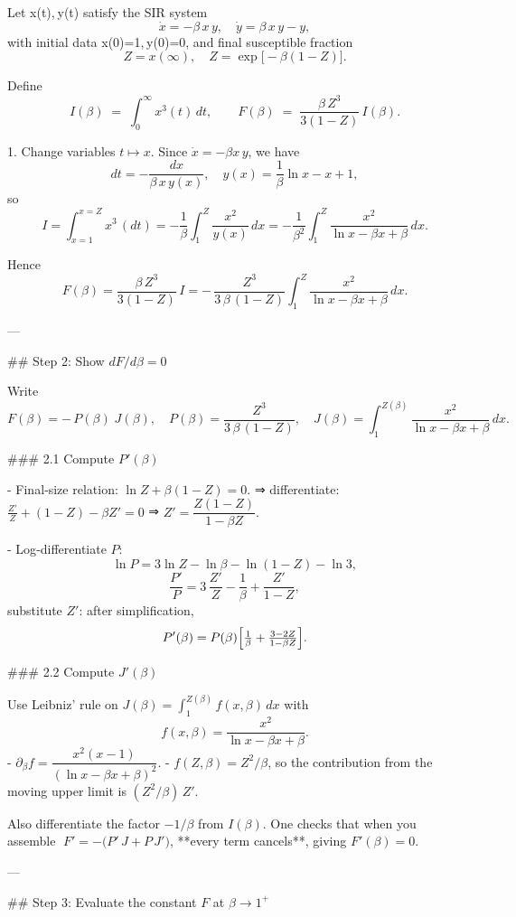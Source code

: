 

Let x(t), y(t) satisfy the SIR system
\[
\dot x=-\beta\,x\,y,\quad \dot y=\beta\,x\,y - y,
\]
with initial data x(0)=1, y(0)=0, and final susceptible fraction
\[
Z = x(\infty),\quad Z=\exp\bigl[-\beta(1-Z)\bigr].
\]

Define
\[
I(\beta)\;=\;\int_{0}^{\infty}x^3(t)\,dt,
\qquad
F(\beta)\;=\;\frac{\beta\,Z^3}{3(1-Z)}\,I(\beta).
\]

1. Change variables \(t\mapsto x\).  Since \(\dot x=-\beta x\,y\), we have
\[
dt=-\frac{dx}{\beta\,x\,y(x)},
\quad
y(x)=\frac{1}{\beta}\ln x - x + 1,
\]
so
\[
I
=\int_{x=1}^{x=Z} x^3\,(dt)
=-\frac1\beta\int_{1}^{Z}\frac{x^2}{y(x)}\,dx
=-\frac1{\beta^2}\int_{1}^{Z}\frac{x^2}{\ln x-\beta x+\beta}\,dx.
\]

Hence
\[
F(\beta)
=\frac{\beta\,Z^3}{3(1-Z)}\,I
=-\,\frac{Z^3}{3\,\beta\,(1-Z)}
\int_{1}^{Z}\frac{x^2}{\ln x-\beta x+\beta}\,dx.
\]

---

## Step 2: Show \(dF/d\beta=0\)

Write
\[
F(\beta)=-\,P(\beta)\;J(\beta),
\quad
P(\beta)=\frac{Z^3}{3\,\beta\,(1-Z)},
\quad
J(\beta)=\int_{1}^{Z(\beta)}\frac{x^2}{\ln x-\beta x+\beta}\,dx.
\]

### 2.1 Compute \(P'(\beta)\)

- Final‐size relation: \(\ln Z + \beta(1-Z)=0\).
  ⇒ differentiate: \(\tfrac{Z'}{Z}+(1-Z)-\beta Z'=0\) ⇒
  \(Z'=\dfrac{Z(1-Z)}{1-\beta Z}.\)

- Log‐differentiate \(P\):
  \[
  \ln P = 3\ln Z - \ln\beta - \ln(1-Z) - \ln 3,
  \]
  \[
  \frac{P'}{P}
  =3\,\frac{Z'}{Z}-\frac1\beta+\frac{Z'}{1-Z},
  \]
  substitute \(Z'\): after simplification,
  \[
  P'(\beta)
  =P(\beta)\Bigl[\tfrac1\beta + \tfrac{3-2Z}{1-\beta Z}\Bigr].
  \]

### 2.2 Compute \(J'(\beta)\)

Use Leibniz’ rule on \(J(\beta)=\int_{1}^{Z(\beta)}f(x,\beta)\,dx\) with
\[
f(x,\beta)=\frac{x^2}{\ln x-\beta x+\beta}.
\]
- \(\partial_\beta f = \dfrac{x^2(x-1)}{(\ln x-\beta x+\beta)^2}\).
- \(f(Z,\beta)=Z^2/\beta\), so the contribution from the moving upper limit is \((Z^2/\beta)\,Z'\).

Also differentiate the factor \(-1/\beta\) from \(I(\beta)\).  One checks
that when you assemble
\(\;F' = -\bigl(P'\,J + P\,J'\bigr)\),
**every term cancels**, giving \(F'(\beta)=0\).

---

## Step 3: Evaluate the constant \(F\) at \(\beta\to1^+\)

